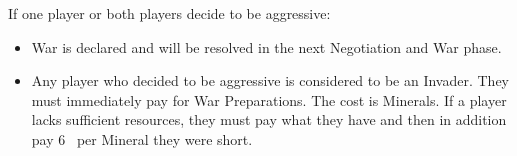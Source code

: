 \documentclass[10pt,twocolumn]{article}
\begin{document}
{\noindent If one player or both players decide to be aggressive:}
\begin{itemize}
\item War is declared and will be resolved in the next Negotiation and War phase.
\item Any player who decided to be aggressive is considered to be an Invader. They must immediately pay for War Preparations. The cost is  Minerals. If a player lacks sufficient resources, they must pay what they have and then in addition pay 6 \vps\ per Mineral they were short.
\iftoggle{original-rules}{
\item A player who decided to be peaceful is considered to be a Defender. They are not required to pay any War Preparation, but will also receive fewer \vps\ in the event of victory.
}{
\item A player who decided to be peaceful is considered to be a Defender. They are not required to pay any War Preparation, but will also receive less \vps\ in the event of victory.
}
\end{itemize}
\end{document}
